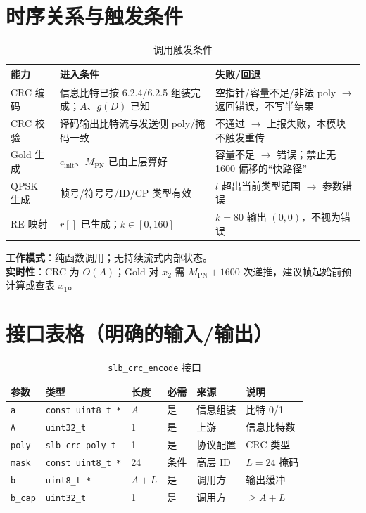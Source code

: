\documentclass[11pt,a4paper]{ctexart}
\begin{document}
\section{时序关系与触发条件}

\begin{longtable}{L{3.5cm}L{5.5cm}L{5.5cm}}
\caption{调用触发条件\label{tab:6513-trig}} \\
\toprule
\textbf{能力} & \textbf{进入条件} & \textbf{失败/回退} \\
\midrule
CRC 编码 & 信息比特已按 6.2.4/6.2.5 组装完成；$A$、$g(D)$ 已知 & 空指针/容量不足/非法 poly $\rightarrow$ 返回错误，不写半结果 \\
CRC 校验 & 译码输出比特流与发送侧 poly/掩码一致 & 不通过 $\rightarrow$ 上报失败，本模块不触发重传 \\
Gold 生成 & $c_{\mathrm{init}}$、$M_{\mathrm{PN}}$ 已由上层算好 & 容量不足 $\rightarrow$ 错误；禁止无 1600 偏移的``快路径'' \\
QPSK 生成 & 帧号/符号号/ID/CP 类型有效 & $l$ 超出当前类型范围 $\rightarrow$ 参数错误 \\
RE 映射 & $r[]$ 已生成；$k\in[0,160]$ & $k{=}80$ 输出 $(0,0)$，不视为错误 \\
\bottomrule
\end{longtable}

\textbf{工作模式}：纯函数调用；无持续流式内部状态。\\
\textbf{实时性}：CRC 为 $O(A)$；Gold 对 $x_2$ 需 $M_{\mathrm{PN}}{+}1600$ 次递推，建议帧起始前预计算或查表 $x_1$。

\section{接口表格（明确的输入/输出）}

\begin{longtable}{L{2.2cm}L{3.0cm}L{1.2cm}L{1.5cm}L{2.2cm}L{4.2cm}}
\caption{\texttt{slb\_crc\_encode} 接口\label{tab:6513-if-crc}} \\
\toprule
\textbf{参数} & \textbf{类型} & \textbf{长度} & \textbf{必需} & \textbf{来源} & \textbf{说明} \\
\midrule
\texttt{a} & \texttt{const uint8\_t *} & $A$ & 是 & 信息组装 & 比特 0/1 \\
\texttt{A} & \texttt{uint32\_t} & 1 & 是 & 上游 & 信息比特数 \\
\texttt{poly} & \texttt{slb\_crc\_poly\_t} & 1 & 是 & 协议配置 & CRC 类型 \\
\texttt{mask} & \texttt{const uint8\_t *} & 24 & 条件 & 高层 ID & $L{=}24$ 掩码 \\
\texttt{b} & \texttt{uint8\_t *} & $A{+}L$ & 是 & 调用方 & 输出缓冲 \\
\texttt{b\_cap} & \texttt{uint32\_t} & 1 & 是 & 调用方 & $\geq A{+}L$ \\
\bottomrule
\end{longtable}
\end{document}
